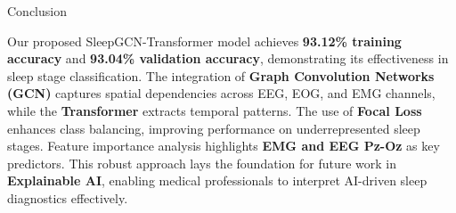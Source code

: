 \begin{frame}{Conclusion}
	\begin{block}{}
		Our proposed SleepGCN-Transformer model achieves \textbf{93.12\% training accuracy} and \textbf{93.04\% validation accuracy}, demonstrating its effectiveness in sleep stage classification. The integration of \textbf{Graph Convolution Networks (GCN)} captures spatial dependencies across EEG, EOG, and EMG channels, while the \textbf{Transformer} extracts temporal patterns. The use of \textbf{Focal Loss} enhances class balancing, improving performance on underrepresented sleep stages. Feature importance analysis highlights \textbf{EMG and EEG Pz-Oz} as key predictors. This robust approach lays the foundation for future work in \textbf{Explainable AI}, enabling medical professionals to interpret AI-driven sleep diagnostics effectively.
	\end{block}
\end{frame}

